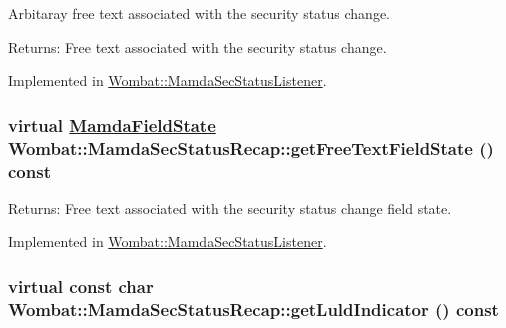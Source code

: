Arbitaray free text associated with the security status change. 

\begin{Desc}
\item[Returns:]Free text associated with the security status change. \end{Desc}


Implemented in \hyperlink{classWombat_1_1MamdaSecStatusListener_cfc40e59afe20f90ea1c0aa616397882}{Wombat::Mamda\-Sec\-Status\-Listener}.\hypertarget{classWombat_1_1MamdaSecStatusRecap_37f29172463022e70f11ffa20ce80a0e}{
\subsubsection[getFreeTextFieldState]{\setlength{\rightskip}{0pt plus 5cm}virtual \hyperlink{namespaceWombat_93aac974f2ab713554fd12a1fa3b7d2a}{Mamda\-Field\-State} Wombat::Mamda\-Sec\-Status\-Recap::get\-Free\-Text\-Field\-State () const}}
\label{classWombat_1_1MamdaSecStatusRecap_37f29172463022e70f11ffa20ce80a0e}


\begin{Desc}
\item[Returns:]Free text associated with the security status change field state. \end{Desc}


Implemented in \hyperlink{classWombat_1_1MamdaSecStatusListener_b0f983bb92ba0f415d5e60ed6405c157}{Wombat::Mamda\-Sec\-Status\-Listener}.\hypertarget{classWombat_1_1MamdaSecStatusRecap_acecbbeb305d9e37961598e3c7bce2b3}{
\subsubsection[getLuldIndicator]{\setlength{\rightskip}{0pt plus 5cm}virtual const char Wombat::Mamda\-Sec\-Status\-Recap::get\-Luld\-Indicator () const}}
\label{classWombat_1_1MamdaSecStatusRecap_acecbbeb305d9e37961598e3c7bce2b3}


